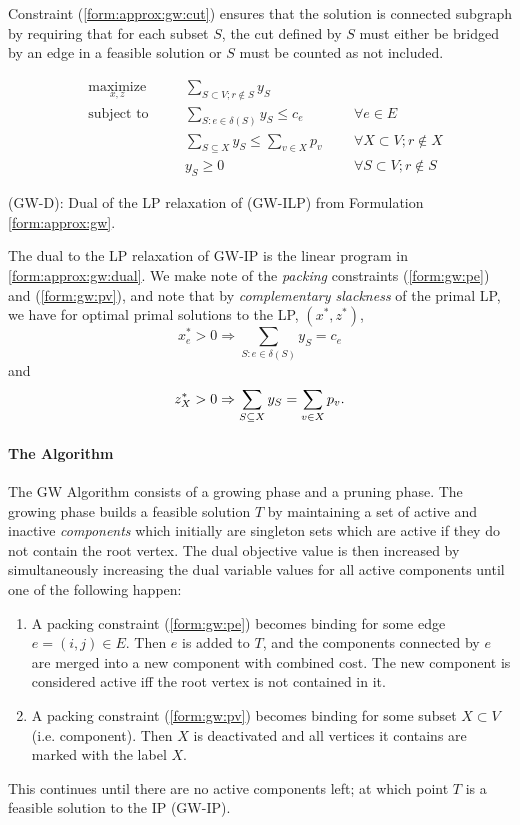  Constraint (\ref{form:approx:gw:cut})
 ensures that the solution is connected subgraph by requiring that for each subset $S$, the cut defined by $S$ must either be
 bridged by an edge in a feasible solution or $S$ must be counted as not included.

 \begin{formulation}[h!]
   \begin{subequations}
     \begin{alignat}{3} 
       &\underset{x, z}{\text{maximize}}
       & & \sum_{S \subset V; r \not\in S} y_S & \\
       & \text{subject to}\quad
       & & \sum_{S: e \in \delta(S)} y_S \leq c_e \qquad&& \forall e \in E \label{form:gw:pe}\\
       &&& \sum_{S \subseteq X} y_S \leq \sum_{v \in X} p_v  && \forall X \subset V; r \not\in X \label{form:gw:pv} \\
       &&& y_S \geq 0  && \forall S \subset V; r \not\in S
     \end{alignat}\label{form:approx:gw:dual}
   \end{subequations}
   \caption{(GW-D): Dual of the LP relaxation of (GW-ILP) from Formulation \ref{form:approx:gw}.}
 \end{formulation}
 
 The dual to the LP relaxation of GW-IP is the linear program in \ref{form:approx:gw:dual}. We make note of the
 \textit{packing} constraints (\ref{form:gw:pe}) and (\ref{form:gw:pv}), and note that by \textit{complementary slackness}
 of the primal LP, we have for optimal primal solutions to the LP, $(x^*, z^*)$,
 $$x^*_e > 0 \Rightarrow \sum_{S: e \in \delta(S)} y_S = c_e$$
 and
 $$z^*_X > 0 \Rightarrow \sum_{S \subseteq X} y_S = \sum_{v \in X} p_v\mathnormal{.}$$
 

 
 \paragraph{The Algorithm} The GW Algorithm consists of a growing phase and a pruning phase. The growing phase
 builds a feasible solution $T$ by maintaining a set of active and inactive \textit{components} which
 initially are singleton sets which are active if they do not contain the root vertex. The dual objective value is then
  increased by simultaneously increasing
  the dual variable values for all active components until one of the following happen:
 \begin{enumerate}[label=\alph*)]
 \item A packing constraint (\ref{form:gw:pe}) becomes binding for some edge $e = (i,j) \in E$. Then $e$ is added
   to $T$, and the components connected by $e$ are merged into a new component with combined cost.
   The new component is considered active iff the root vertex is not contained in it.
 \item A packing constraint (\ref{form:gw:pv}) becomes binding for some subset $X  \subset V$ (i.e. component). Then $X$ is deactivated
    and all vertices it contains are marked with the label $X$.
 \end{enumerate}
 This continues until there are no active components left; at which point $T$ is a feasible solution to the IP (GW-IP).

